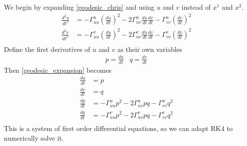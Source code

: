 \documentclass{article}
\begin{document}
		We begin by expanding \ref{geodesic_chris} and using $u$ and $v$ instead of $x^1$ and $x^2$.
		\begin{equation} \label{geodesic_expansion} \begin{split} 
			\frac{d^2u}{dt^2} & = -\Gamma^u_{uu}\left(\frac{du}{dt}\right)^2-2\Gamma^u_{uv}\frac{du}{dt}\frac{dv}{dt}-\Gamma^u_{vv}\left(\frac{dv}{dt}\right)^2 \\
			\frac{d^2v}{dt^2} & = -\Gamma^v_{uu}\left(\frac{du}{dt}\right)^2-2\Gamma^v_{uv}\frac{du}{dt}\frac{dv}{dt}-\Gamma^v_{vv}\left(\frac{dv}{dt}\right)^2 \\
		\end{split} \end{equation}
		Define the first derivatives of $u$ and $v$ as their own variables
		\begin{equation*} \begin{array}{cc}
			p = \frac{du}{dt} & q = \frac{dv}{dt}
		\end{array} \end{equation*}
		Then \ref{geodesic_expansion} becomes
		\begin{equation} \begin{split}
			\frac{du}{dt} & = p \\
			\frac{dv}{dt} & = q \\
			\frac{dp}{dt} & = -\Gamma^u_{uu}p^2-2\Gamma^u_{uv}pq-\Gamma^u_{vv}q^2 \\
			\frac{dq}{dt} & = -\Gamma^v_{uu}p^2-2\Gamma^v_{uv}pq-\Gamma^v_{vv}q^2 \\
		\end{split} \end{equation}
		This is a system of first order differential equations, so we can adapt RK4 to numerically solve it.
		
\end{document}
